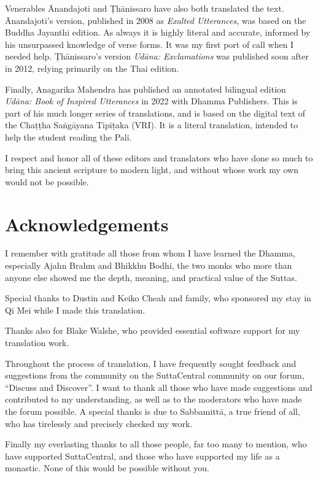 \documentclass[12pt,openany]{book}%
\begin{document}
Venerables Ānandajoti and \textsanskrit{Ṭhānissaro} have also both translated the text. Ānandajoti’s version, published in 2008 as \textit{Exalted Utterances}, was based on the Buddha Jayanthi edition. As always it is highly literal and accurate, informed by his unsurpassed knowledge of verse forms. It was my first port of call when I needed help. \textsanskrit{Ṭhānissaro}’s version \textit{\textsanskrit{Udāna}: Exclamations} was published soon after in 2012, relying primarily on the Thai edition.

Finally, Anagarika Mahendra has published an annotated bilingual edition \textit{\textsanskrit{Udāna}: Book of Inspired Utterances} in 2022 with Dhamma Publishers. This is part of his much longer series of translations, and is based on the digital text of the \textsanskrit{Chaṭṭha} \textsanskrit{Saṅgāyana} \textsanskrit{Tipiṭaka} (VRI). It is a literal translation, intended to help the student reading the Pali.

I respect and honor all of these editors and translators who have done so much to bring this ancient scripture to modern light, and without whose work my own would not be possible.

%
\chapter*{Acknowledgements}

I remember with gratitude all those from whom I have learned the Dhamma, especially Ajahn Brahm and Bhikkhu Bodhi, the two monks who more than anyone else showed me the depth, meaning, and practical value of the Suttas.

Special thanks to Dustin and Keiko Cheah and family, who sponsored my stay in Qi Mei while I made this translation.

Thanks also for Blake Walshe, who provided essential software support for my translation work.

Throughout the process of translation, I have frequently sought feedback and suggestions from the community on the SuttaCentral community on our forum, “Discuss and Discover”. I want to thank all those who have made suggestions and contributed to my understanding, as well as to the moderators who have made the forum possible. A special thanks is due to \textsanskrit{Sabbamittā}, a true friend of all, who has tirelessly and precisely checked my work.

Finally my everlasting thanks to all those people, far too many to mention, who have supported SuttaCentral, and those who have supported my life as a monastic. None of this would be possible without you.
\end{document}

